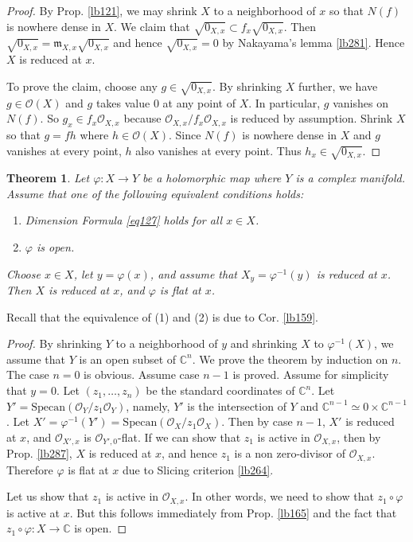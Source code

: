 \documentclass[12pt,b5paper,notitlepage]{report}
\theoremstyle{definition}
\theoremstyle{plain}
\newtheorem{thm}[df]{Theorem}
\newcommand{\scr}{\mathscr}
\newcommand{\Cbb}{\mathbb C}
\newcommand{\Specan}{\mathrm{Specan}}
\newcommand{\mk}{\mathfrak m}
\numberwithin{equation}{section}
\begin{document}
\begin{proof}
By Prop. \ref{lb121}, we may shrink $X$ to a neighborhood of $x$ so that $N(f)$ is nowhere dense in $X$. We claim that $\sqrt{0_{X,x}}\subset f_x\sqrt{0_{X,x}}$. Then $\sqrt{0_{X,x}}=\mk_{X,x}\sqrt{0_{X,x}}$ and hence $\sqrt{0_{X,x}}=0$ by Nakayama's lemma \ref{lb281}. Hence $X$ is reduced at $x$.

To prove the claim, choose any $g\in\sqrt{0_{X,x}}$. By shrinking $X$ further, we have $g\in\scr O(X)$ and $g$ takes value $0$ at any point of $X$. In particular, $g$ vanishes on $N(f)$.  So $g_x\in f_x\scr O_{X,x}$ because $\scr O_{X,x}/f_x\scr O_{X,x}$ is reduced by assumption. Shrink $X$ so that $g=fh$ where $h\in\scr O(X)$. Since $N(f)$ is nowhere dense in $X$ and $g$ vanishes at every point, $h$ also vanishes at every point. Thus $h_x\in\sqrt{0_{X,x}}$. 
\end{proof}



\begin{thm}\label{lb288}
Let $\varphi:X\rightarrow Y$ be a holomorphic map where $Y$ is a complex manifold. Assume that one of the following equivalent conditions holds:
\begin{enumerate}[label=(\arabic*)]
\item Dimension Formula \eqref{eq127} holds for all $x\in X$.
\item $\varphi$ is open.
\end{enumerate}
Choose $x\in X$, let $y=\varphi(x)$, and assume that $X_y=\varphi^{-1}(y)$ is reduced at $x$. Then $X$ is reduced at $x$, and $\varphi$ is flat at $x$.
\end{thm}

Recall that the equivalence of (1) and (2) is due to Cor. \ref{lb159}.


\begin{proof}
By shrinking $Y$ to a neighborhood of $y$ and shrinking $X$ to $\varphi^{-1}(X)$, we assume that $Y$ is an open subset of $\Cbb^n$. We prove the theorem by induction on $n$. The case $n=0$ is obvious. Assume case $n-1$ is proved. Assume for simplicity that $y=0$. Let $(z_1,\dots,z_n)$ be the standard coordinates of $\Cbb^n$. Let $Y'=\Specan(\scr O_Y/z_1\scr O_Y)$, namely, $Y'$ is the intersection of $Y$ and $\Cbb^{n-1}\simeq0\times\Cbb^{n-1}$. Let $X'=\varphi^{-1}(Y')=\Specan(\scr O_X/z_1\scr O_X)$. Then by case $n-1$, $X'$ is reduced at $x$, and $\scr O_{X',x}$ is $\scr O_{Y',0}$-flat. If we can show that $z_1$ is active in $\scr O_{X,x}$, then by Prop. \ref{lb287}, $X$ is reduced at $x$, and hence $z_1$ is a non zero-divisor of $\scr O_{X,x}$. Therefore $\varphi$ is flat at $x$ due to Slicing criterion \ref{lb264}.

Let us show that $z_1$ is active in $\scr O_{X,x}$. In other words, we need to show that $z_1\circ\varphi$ is active at $x$. But this follows immediately from Prop. \ref{lb165} and the fact that $z_1\circ\varphi:X\rightarrow\Cbb$ is open.
\end{proof}
\end{document}
